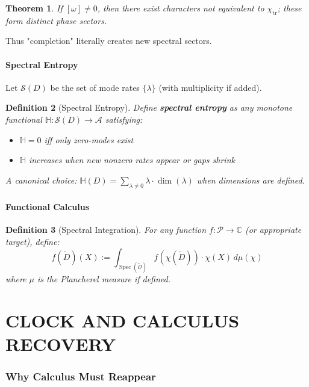 \documentclass[12pt, oneside]{article}
\newtheorem{theorem}{Theorem}[section]
\newtheorem{definition}[theorem]{Definition}
\DeclareMathOperator{\tr}{tr}
\DeclareMathOperator{\Spec}{Spec}
\newcommand{\A}{\mathcal{A}}
\newcommand{\Opr}{\mathcal{O}}
\begin{document}
\begin{theorem}
If $[\omega] \neq 0$, then there exist characters not equivalent to $\chi_{\tr}$; these form distinct phase sectors.
\end{theorem}

Thus "completion" literally creates new spectral sectors.

\subsection{Spectral Entropy}

Let $\mathcal{S}(D)$ be the set of mode rates $\{\lambda\}$ (with multiplicity if added).

\begin{definition}[Spectral Entropy]
Define \textbf{spectral entropy} as any monotone functional $\mathbb{H}: \mathcal{S}(D) \rightarrow \A$ satisfying:
\begin{itemize}
    \item $\mathbb{H} = 0$ iff only zero-modes exist
    \item $\mathbb{H}$ increases when new nonzero rates appear or gaps shrink
\end{itemize}
A canonical choice: $\mathbb{H}(D) = \sum_{\lambda \neq 0} \lambda \cdot \dim(\lambda)$ when dimensions are defined.
\end{definition}

\subsection{Functional Calculus}

\begin{definition}[Spectral Integration]
For any function $f: \mathcal{P} \rightarrow \mathbb{C}$ (or appropriate target), define:
\begin{equation}
f(\widetilde{D})(X) := \int_{\Spec(\widetilde{\Opr})} f(\chi(\widetilde{D})) \cdot \chi(X) \, d\mu(\chi)
\end{equation}
where $\mu$ is the Plancherel measure if defined.
\end{definition}

\newpage

\part{CLOCK AND CALCULUS RECOVERY}

\section{Why Calculus Must Reappear}
\end{document}
